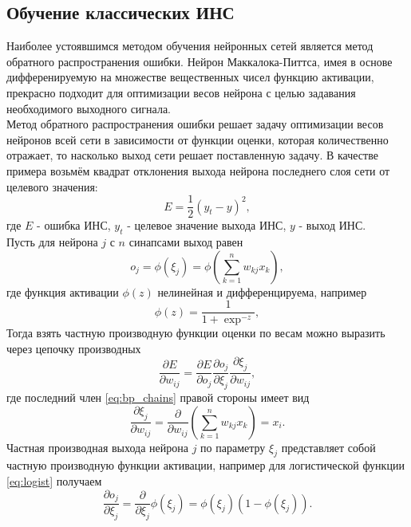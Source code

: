 \documentclass[a4paper,10pt]{article}
\begin{document}
\subsection{Обучение классических ИНС}
\indent Наиболее устоявшимся методом обучения нейронных сетей является метод обратного распространения ошибки. Нейрон Маккалока-Питтса, имея в основе дифференируемую на множестве вещественных чисел функцию активации, прекрасно подходит для оптимизации весов нейрона с целью задавания необходимого выходного сигнала.\\  
\indent Метод обратного распространения ошибки решает задачу оптимизации весов нейронов всей сети в зависимости от функции оценки, которая количественно отражает, то насколько выход сети решает поставленную задачу. В качестве примера возьмём квадрат отклонения выхода нейрона последнего слоя сети от целевого значения:
\begin{equation}
E = \frac{1}{2}(y_{t}-y)^2,
\end{equation} 
где $E$ - ошибка ИНС, $y_{t}$ - целевое значение выхода ИНС, $y$ - выход ИНС.\\
\indent Пусть для нейрона $j$ с $n$ синапсами выход равен
\begin{equation}
o_{j}=\phi (\xi_{j}) = \phi \left(\sum_{k=1}^{n}w_{kj}x_{k}\right),
\end{equation}
где функция активации $\phi(z)$ нелинейная и дифференцируема, например
\begin{equation}\label{eq:logist}
\phi(z)=\frac{1}{1+\exp^{-z}},
\end{equation}
Тогда взять частную производную функции оценки по весам можно выразить через цепочку производных
\begin{equation}\label{eq:bp_chains}
\frac{\partial E}{\partial w_{ij}} = \frac{\partial E}{\partial o_{j}} \frac{{\partial o_{j}}}{\partial \xi_j} \frac{\partial \xi_j}{\partial w_{ij}},
\end{equation}
где последний член \eqref{eq:bp_chains} правой стороны имеет вид
\begin{equation}
\frac{{\partial \xi_{j}}}{\partial w_{ij}} = \frac{\partial}{\partial w_{ij}} \left(\sum_{k=1}^{n}w_{kj}x_{k}\right) = x_{i}.
\end{equation}
Частная производная выхода нейрона $j$ по параметру $\xi_{j}$ представляет собой частную производную функции активации, например для логистической функции \eqref{eq:logist} получаем
\begin{equation}
\frac{{\partial o_{j}}}{\partial \xi_{j}} = \frac{\partial}{\partial \xi_{j}} \phi(\xi_{j}) = \phi(\xi_{j})(1-\phi(\xi_{j})).
\end{equation}
\end{document}
